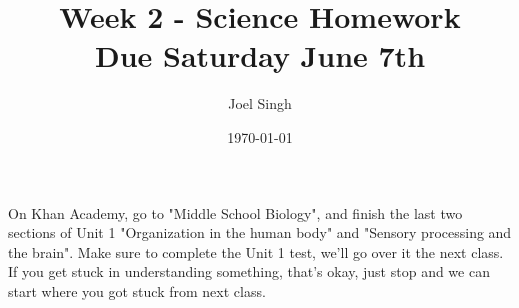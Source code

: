 \documentclass{article}
\title{Week 2 - Science Homework \\ Due Saturday June 7th}
\author{Joel Singh}
\date{\today}
\begin{document}
\maketitle

On Khan Academy, go to "Middle School Biology", and finish the last two sections of Unit 1 "Organization in the human body" and "Sensory processing and the brain". Make sure to complete the Unit 1 test, we'll go over it the next class. If you get stuck in understanding something,  that's okay, just stop and we can start where you got stuck from next class.
\end{document}
